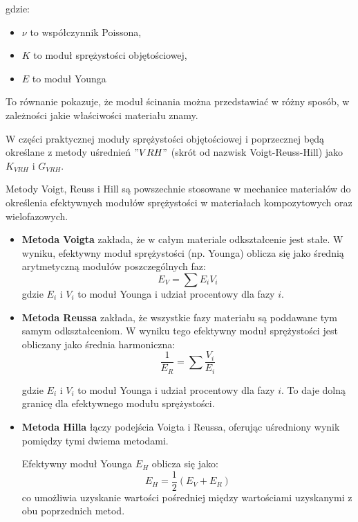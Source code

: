 gdzie:
\begin{itemize}
  \item $\nu$ to współczynnik Poissona,
  \item $K$ to moduł sprężystości objętościowej,
  \item $E$ to moduł Younga
\end{itemize}


To równanie pokazuje, że moduł ścinania można przedstawiać w różny sposób, w zależności jakie właściwości materiału znamy. 

\clearpage

\hspace{1.5cm} W części praktycznej moduły sprężystości objętościowej i poprzecznej będą określane z metody uśrednień $"V R H"$ (skrót od nazwisk Voigt-Reuss-Hill) jako $K_{VRH}$ i $G_{VRH}$.

\hspace{1.5cm} Metody Voigt, Reuss i Hill \cite{alma991000386409708832, url_sparrow_przegl_papier_2024_05} są powszechnie stosowane w mechanice materiałów do określenia efektywnych modułów sprężystości w materiałach kompozytowych oraz wielofazowych.

\begin{itemize}

  \item {\textbf{Metoda Voigta} zakłada, że w całym materiale odkształcenie jest stałe. W wyniku, efektywny moduł sprężystości (np. Younga) oblicza się jako średnią arytmetyczną modułów poszczególnych faz:
$$
  E_V = \sum{E_iV_i}
$$
gdzie $E_i$ i $V_i$ to moduł Younga i udział procentowy dla fazy $i$.}

  \item {\textbf{Metoda Reussa} zakłada, że wszystkie fazy materiału są poddawane tym samym odkształceniom. W wyniku tego efektywny moduł sprężystości jest obliczany jako średnia harmoniczna:
  $$
  \frac{1}{E_R} = \sum\frac{V_i}{E_i}
  $$

gdzie $E_i$ i $V_i$ to moduł Younga i udział procentowy dla fazy $i$.
To daje dolną granicę dla efektywnego modułu sprężystości.}
  \item {\textbf{Metoda Hilla} łączy podejścia Voigta i Reussa, oferując uśredniony wynik pomiędzy tymi dwiema metodami. 

Efektywny moduł Younga $E_H$ oblicza się jako:
  $$
  E_H = \frac{1}{2}\left(E_V + E_R\right)
  $$
  co umożliwia uzyskanie wartości pośredniej między wartościami uzyskanymi z obu poprzednich metod.
}

\end{itemize}

\clearpage
